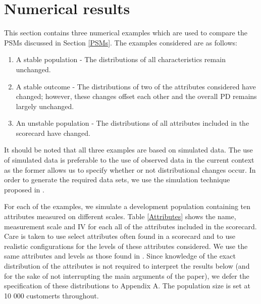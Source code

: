 \documentclass{article}
\theoremstyle{def}
\begin{document}

\newpage

\section{Numerical results} \label{Numerics}

This section contains three numerical examples which are used to compare the PSMs discussed in Section \ref{PSMs}. The examples considered are as follows:
\begin{enumerate}
    \item A stable population - The distributions of all characteristics remain unchanged.
    \item A stable outcome - The distributions of two of the attributes considered have changed; however, these changes offset each other and the overall PD remains largely unchanged.
    \item An unstable population - The distributions of all attributes included in the scorecard have changed.
\end{enumerate}
It should be noted that all three examples are based on simulated data. The use of simulated data is preferable to the use of observed data in the current context as the former allows us to specify whether or not distributional changes occur. In order to generate the required data sets, we use the simulation technique proposed in \cite{DUPISANIEVISAGIEALLISON2022}.

For each of the examples, we simulate a development population containing ten attributes measured on different scales. Table \ref{Attributes} shows the name, measurement scale and IV for each all of the attributes included in the scorecard. Care is taken to use select attributes often found in a scorecard and to use realistic configurations for the levels of these attributes considered. We use the same attributes and levels as those found in \cite{DUPISANIEVISAGIEALLISON2022}. Since knowledge of the exact distribution of the attributes is not required to interpret the results below (and for the sake of not interrupting the main arguments of the paper), we defer the specification of these distributions to Appendix A. The population size is set at 10 000 customerts throughout.
\end{document}

